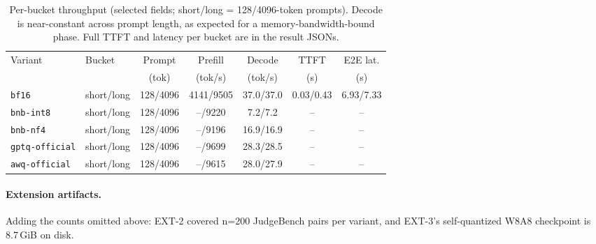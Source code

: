 \documentclass[11pt,a4paper]{article}
\begin{document}
\begin{table}[H]
\centering\small
\begin{tabular}{llccccc}
\toprule
Variant & Bucket & Prompt & Prefill & Decode & TTFT & E2E lat. \\
        &        & (tok)  & (tok/s) & (tok/s) & (s) & (s) \\
\midrule
\texttt{bf16}          & short/long & 128/4096 & 4141/9505 & 37.0/37.0 & 0.03/0.43 & 6.93/7.33 \\
\texttt{bnb-int8}      & short/long & 128/4096 & --/9220   & 7.2/7.2   & --        & -- \\
\texttt{bnb-nf4}       & short/long & 128/4096 & --/9196   & 16.9/16.9 & --        & -- \\
\texttt{gptq-official} & short/long & 128/4096 & --/9699   & 28.3/28.5 & --        & -- \\
\texttt{awq-official}  & short/long & 128/4096 & --/9615   & 28.0/27.9 & --        & -- \\
\bottomrule
\end{tabular}
\caption{Per-bucket throughput (selected fields; short/long = 128/4096-token
prompts). Decode is near-constant across prompt length, as expected for a
memory-bandwidth-bound phase. Full TTFT and latency per bucket are in the result
JSONs.}
\label{tab:eff-full}
\end{table}

\paragraph{Extension artifacts.} Adding the counts omitted above: EXT-2 covered
n=200 JudgeBench pairs per variant, and EXT-3's self-quantized W8A8 checkpoint is
8.7\,GiB on disk.
\end{document}
